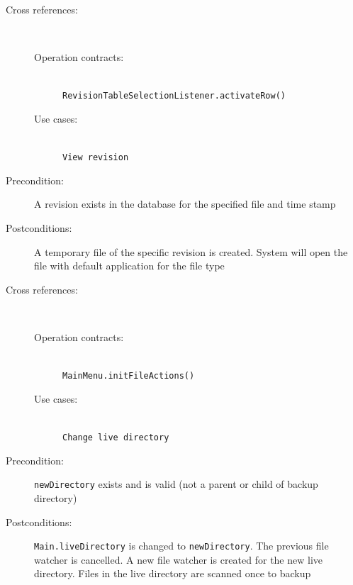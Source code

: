 \documentclass[12pt,a4paper]{article}
\begin{document}
\begin{description}
	\item[Cross references:] \hfill \vspace{-4ex}  \\
	\begin{description} 
		\item[Operation contracts:] \hfill \\
			\texttt{RevisionTableSelectionListener.activateRow()}
		\item[Use cases:] \hfill \\
			\texttt{View revision}
	\end{description}	
	\item[Precondition:] A revision exists in the database for the specified file and time stamp
	\item[Postconditions:] A temporary file of the specific revision is created. System will open the file with default application for the file type
\end{description}

\vspace{0.75cm}

\begin{description}
	\item[Cross references:] \hfill \vspace{-4ex}  \\
		\begin{description} 
		\item[Operation contracts:] \hfill \\
			\texttt{MainMenu.initFileActions()}
		\item[Use cases:] \hfill \\
			\texttt{Change live directory}
	\end{description}	
	\item[Precondition:] \texttt{newDirectory} exists and is valid (not a parent or child of backup directory)
	\item[Postconditions:] \texttt{Main.liveDirectory} is changed to \texttt{newDirectory}. The previous file watcher is cancelled. A new file watcher is created for the new live directory. Files in the live directory are scanned once to backup
\end{description}

\vspace{0.75cm}
\end{document}
